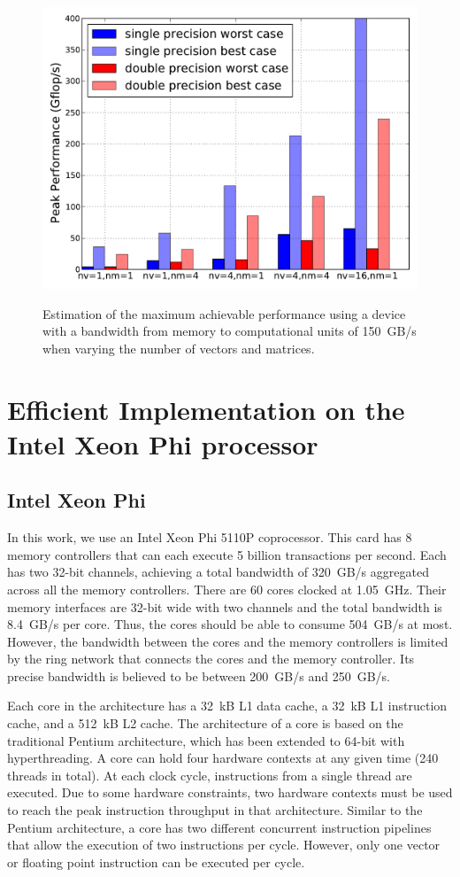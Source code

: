 \documentclass{sig-alternate}
\begin{document}
\begin{figure}
  \centering 
  \includegraphics[width=.9\linewidth]{figures/gflops_peak.pdf}\label{fig:gflops-peak-perf}
  \caption{Estimation of the maximum achievable performance using a
    device with a bandwidth from memory to computational units of 150~GB/s when
    varying the number of vectors and matrices.}
  \label{fig:perf_predict}
\end{figure}

\section{Efficient Implementation on the Intel Xeon Phi processor}
\label{sec:impl}

\subsection{Intel Xeon Phi}

In this work, we use an Intel Xeon Phi 5110P coprocessor. This card
has 8 memory controllers that can each execute 5 billion
transactions per second. Each has two 32-bit channels, achieving a total
bandwidth of 320~GB/s aggregated across all the memory
controllers. There are 60 cores clocked at 1.05~GHz. Their memory
interfaces are 32-bit wide with two channels and the total bandwidth
is 8.4~GB/s per core. Thus, the cores should be able to consume 504~GB/s
at most. However, the bandwidth between the cores and the memory
controllers is limited by the ring network that connects the cores and
the memory controller. Its precise bandwidth is
believed to be between 200~GB/s and 250~GB/s.

Each core in the architecture has a 32~kB L1 data cache, a 32~kB L1
instruction cache, and a 512~kB L2 cache. The architecture of a core is
based on the traditional Pentium architecture, which has been extended to
64-bit with hyperthreading. A core can hold four hardware contexts at any given time (240 threads in total). At each
clock cycle, instructions from a single thread are executed. Due to
some hardware constraints, two hardware contexts must be used to reach
the peak instruction throughput in that architecture. Similar to the
Pentium architecture, a core has two different concurrent instruction
pipelines that allow the execution of two instructions per
cycle. However, only one vector or floating point instruction can be
executed per cycle.
\end{document}

